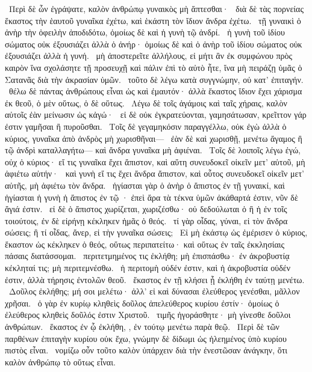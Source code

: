 ~Περὶ δὲ ὧν ἐγράψατε, καλὸν ἀνθρώπῳ γυναικὸς μὴ ἅπτεσθαι·
~διὰ δὲ τὰς πορνείας ἕκαστος τὴν ἑαυτοῦ γυναῖκα ἐχέτω, καὶ ἑκάστη τὸν ἴδιον ἄνδρα ἐχέτω.
~τῇ γυναικὶ ὁ ἀνὴρ τὴν ὀφειλὴν ἀποδιδότω, ὁμοίως δὲ καὶ ἡ γυνὴ τῷ ἀνδρί.
~ἡ γυνὴ τοῦ ἰδίου σώματος οὐκ ἐξουσιάζει ἀλλὰ ὁ ἀνήρ· ὁμοίως δὲ καὶ ὁ ἀνὴρ τοῦ ἰδίου σώματος οὐκ ἐξουσιάζει ἀλλὰ ἡ γυνή.
~μὴ ἀποστερεῖτε ἀλλήλους, εἰ μήτι ἂν ἐκ συμφώνου πρὸς καιρὸν ἵνα σχολάσητε τῇ προσευχῇ καὶ πάλιν ἐπὶ τὸ αὐτὸ ἦτε, ἵνα μὴ πειράζῃ ὑμᾶς ὁ Σατανᾶς διὰ τὴν ἀκρασίαν ὑμῶν.
~τοῦτο δὲ λέγω κατὰ συγγνώμην, οὐ κατ’ ἐπιταγήν.
~θέλω δὲ πάντας ἀνθρώπους εἶναι ὡς καὶ ἐμαυτόν· ἀλλὰ ἕκαστος ἴδιον ἔχει χάρισμα ἐκ θεοῦ, ὁ μὲν οὕτως, ὁ δὲ οὕτως.
~Λέγω δὲ τοῖς ἀγάμοις καὶ ταῖς χήραις, καλὸν αὐτοῖς ἐὰν μείνωσιν ὡς κἀγώ·
~εἰ δὲ οὐκ ἐγκρατεύονται, γαμησάτωσαν, κρεῖττον γάρ ἐστιν γαμῆσαι ἢ πυροῦσθαι.
~Τοῖς δὲ γεγαμηκόσιν παραγγέλλω, οὐκ ἐγὼ ἀλλὰ ὁ κύριος, γυναῖκα ἀπὸ ἀνδρὸς μὴ χωρισθῆναι—
~ἐὰν δὲ καὶ χωρισθῇ, μενέτω ἄγαμος ἢ τῷ ἀνδρὶ καταλλαγήτω— καὶ ἄνδρα γυναῖκα μὴ ἀφιέναι.
~Τοῖς δὲ λοιποῖς λέγω ἐγώ, οὐχ ὁ κύριος· εἴ τις  γυναῖκα ἔχει ἄπιστον, καὶ αὕτη συνευδοκεῖ οἰκεῖν μετ’ αὐτοῦ, μὴ ἀφιέτω αὐτήν·
~καὶ γυνὴ εἴ τις ἔχει ἄνδρα ἄπιστον, καὶ οὗτος συνευδοκεῖ οἰκεῖν μετ’ αὐτῆς, μὴ ἀφιέτω τὸν ἄνδρα.
~ἡγίασται γὰρ ὁ ἀνὴρ ὁ ἄπιστος ἐν τῇ γυναικί, καὶ ἡγίασται ἡ γυνὴ ἡ ἄπιστος ἐν τῷ · ἐπεὶ ἄρα τὰ τέκνα ὑμῶν ἀκάθαρτά ἐστιν, νῦν δὲ ἅγιά ἐστιν.
~εἰ δὲ ὁ ἄπιστος χωρίζεται, χωριζέσθω· οὐ δεδούλωται ὁ  ἢ ἡ  ἐν τοῖς τοιούτοις, ἐν δὲ εἰρήνῃ κέκληκεν ἡμᾶς ὁ θεός.
~τί γὰρ οἶδας, γύναι, εἰ τὸν ἄνδρα σώσεις; ἢ τί οἶδας, ἄνερ, εἰ τὴν γυναῖκα σώσεις;
~Εἰ μὴ ἑκάστῳ ὡς ἐμέρισεν ὁ κύριος, ἕκαστον ὡς κέκληκεν ὁ θεός, οὕτως περιπατείτω· καὶ οὕτως ἐν ταῖς ἐκκλησίαις πάσαις διατάσσομαι.
~περιτετμημένος τις ἐκλήθη; μὴ ἐπισπάσθω· ἐν ἀκροβυστίᾳ κέκληταί τις; μὴ περιτεμνέσθω.
~ἡ περιτομὴ οὐδέν ἐστιν, καὶ ἡ ἀκροβυστία οὐδέν ἐστιν, ἀλλὰ τήρησις ἐντολῶν θεοῦ.
~ἕκαστος ἐν τῇ κλήσει ᾗ ἐκλήθη ἐν ταύτῃ μενέτω.
~Δοῦλος ἐκλήθης; μή σοι μελέτω· ἀλλ’ εἰ καὶ δύνασαι ἐλεύθερος γενέσθαι, μᾶλλον χρῆσαι.
~ὁ γὰρ ἐν κυρίῳ κληθεὶς δοῦλος ἀπελεύθερος κυρίου ἐστίν· ὁμοίως ὁ ἐλεύθερος κληθεὶς δοῦλός ἐστιν Χριστοῦ.
~τιμῆς ἠγοράσθητε· μὴ γίνεσθε δοῦλοι ἀνθρώπων.
~ἕκαστος ἐν ᾧ ἐκλήθη, , ἐν τούτῳ μενέτω παρὰ θεῷ.
~Περὶ δὲ τῶν παρθένων ἐπιταγὴν κυρίου οὐκ ἔχω, γνώμην δὲ δίδωμι ὡς ἠλεημένος ὑπὸ κυρίου πιστὸς εἶναι.
~νομίζω οὖν τοῦτο καλὸν ὑπάρχειν διὰ τὴν ἐνεστῶσαν ἀνάγκην, ὅτι καλὸν ἀνθρώπῳ τὸ οὕτως εἶναι.
